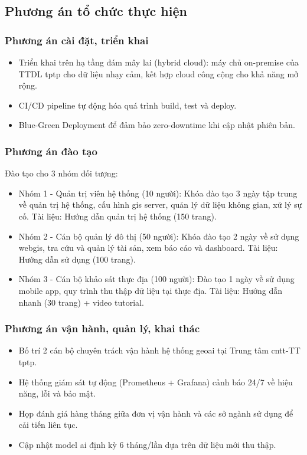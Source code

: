 \subsection{Phương án tổ chức thực hiện}

\subsubsection{Phương án cài đặt, triển khai}
\begin{itemize}
    \item Triển khai trên hạ tầng đám mây lai (hybrid cloud): máy chủ on-premise của TTDL \gls{tptp} cho dữ liệu nhạy cảm, kết hợp cloud công cộng cho khả năng mở rộng.
    \item CI/CD pipeline tự động hóa quá trình build, test và deploy.
    \item Blue-Green Deployment để đảm bảo zero-downtime khi cập nhật phiên bản.
\end{itemize}

\subsubsection{Phương án đào tạo}
Đào tạo cho 3 nhóm đối tượng:
\begin{itemize}
    \item Nhóm 1 - Quản trị viên hệ thống (10 người): Khóa đào tạo 3 ngày tập trung về quản trị hệ thống, cấu hình \gls{gis} server, quản lý dữ liệu không gian, xử lý sự cố. Tài liệu: Hướng dẫn quản trị hệ thống (150 trang).
    \item Nhóm 2 - Cán bộ quản lý đô thị (50 người): Khóa đào tạo 2 ngày về sử dụng \gls{webgis}, tra cứu và quản lý tài sản, xem báo cáo và dashboard. Tài liệu: Hướng dẫn sử dụng (100 trang).
    \item Nhóm 3 - Cán bộ khảo sát thực địa (100 người): Đào tạo 1 ngày về sử dụng mobile app, quy trình thu thập dữ liệu tại thực địa. Tài liệu: Hướng dẫn nhanh (30 trang) + video tutorial.
\end{itemize}
\cleardoublepage
\subsubsection{Phương án vận hành, quản lý, khai thác}
\begin{itemize}
    \item Bố trí 2 cán bộ chuyên trách vận hành hệ thống \gls{geoai} tại Trung tâm \gls{cntt}-TT \gls{tptp}.
    \item Hệ thống giám sát tự động (Prometheus + Grafana) cảnh báo 24/7 về hiệu năng, lỗi và bảo mật.
    \item Họp đánh giá hàng tháng giữa đơn vị vận hành và các sở ngành sử dụng để cải tiến liên tục.
    \item Cập nhật model \gls{ai} định kỳ 6 tháng/lần dựa trên dữ liệu mới thu thập.
\end{itemize}

